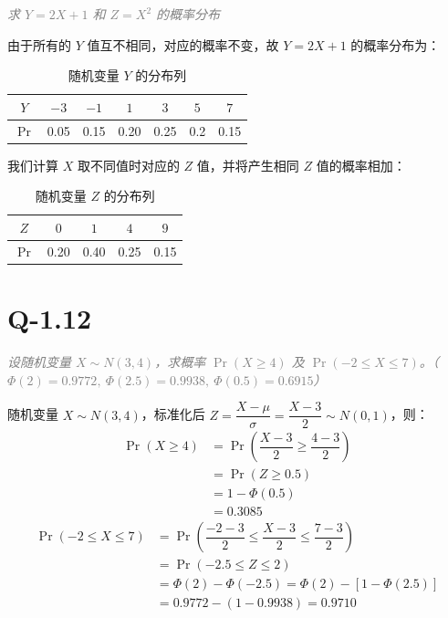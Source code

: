 \documentclass{article}
\begin{document}
\textit{\textcolor{gray}{求 $Y=2X+1$ 和 $Z=X^2$ 的概率分布}}

由于所有的 $Y$ 值互不相同，对应的概率不变，故 $Y=2X+1$ 的概率分布为：

\begin{table}[H]
    \centering
    \renewcommand{\arraystretch}{1.2}
    \setlength{\tabcolsep}{16pt}
    \caption{随机变量 $Y$ 的分布列}
    \begin{tabular}{|c|c|c|c|c|c|c|}
        \hline
        $Y$ & $-3$ & $-1$ & $1$ & $3$ & $5$ & $7$ \\
        \hline
        $\Pr$ & 0.05 & 0.15 & 0.20 & 0.25 & 0.2 & 0.15 \\
        \hline
    \end{tabular}
\end{table}

我们计算 $X$ 取不同值时对应的 $Z$ 值，并将产生相同 $Z$ 值的概率相加：

\begin{table}[H]
    \centering
    \renewcommand{\arraystretch}{1.2}
    \setlength{\tabcolsep}{16pt}
    \caption{随机变量 $Z$ 的分布列}
    \begin{tabular}{|c|c|c|c|c|}
        \hline
        $Z$ & $0$ & $1$ & $4$ & $9$ \\
        \hline
        $\Pr$ & 0.20 & 0.40 & 0.25 & 0.15 \\
        \hline
    \end{tabular}
\end{table}



\section{Q-1.12}
\textit{\textcolor{gray}{设随机变量 $X\sim N(3,4)$，求概率 $\Pr(X\geqslant4)$ 及 $\Pr(-2\leqslant X\leqslant7)$。（$\Phi(2)=0.9772,\ \Phi(2.5)=0.9938,\ \Phi(0.5)=0.6915$）}}

随机变量 $X\sim N(3,4)$，标准化后 $Z=\dfrac{X-\mu}{\sigma}=\dfrac{X-3}{2}\sim N(0,1)$，则：
\begin{align*}
    \Pr(X\geqslant4)&=\Pr\left(\dfrac{X-3}{2}\geqslant\dfrac{4-3}{2}\right)
    \\
    &=\Pr(Z\geqslant0.5)
    \\
    &=1-\Phi(0.5)
    \\
    &=0.3085
\end{align*}
\begin{align*}
    \Pr(-2\leqslant X\leqslant7)&=\Pr\left(\dfrac{-2-3}{2}\leqslant\dfrac{X-3}{2}\leqslant\dfrac{7-3}{2}\right)
    \\
    &=\Pr(-2.5\leqslant Z\leqslant2)
    \\
    &=\Phi(2)-\Phi(-2.5)=\Phi(2)-\left[1-\Phi(2.5)\right]
    \\
    &=0.9772-(1-0.9938)=0.9710
\end{align*}
\end{document}
